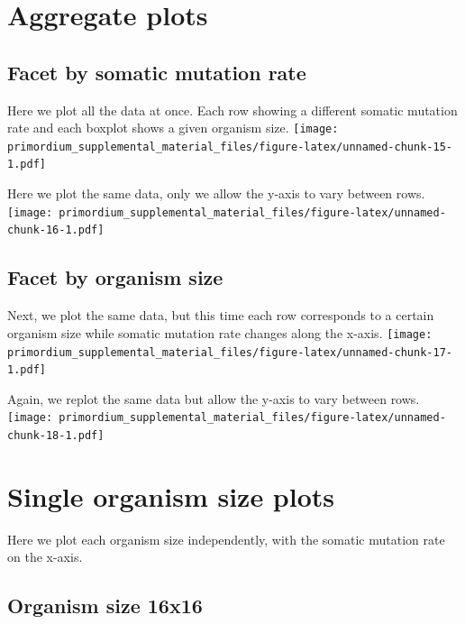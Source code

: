 \documentclass[]{book}
\begin{document}
\hypertarget{aggregate-plots-1}{%
\section{Aggregate plots}\label{aggregate-plots-1}}

\hypertarget{facet-by-somatic-mutation-rate}{%
\subsection{Facet by somatic mutation rate}\label{facet-by-somatic-mutation-rate}}

Here we plot all the data at once.
Each row showing a different somatic mutation rate and each boxplot shows a given organism size.
\texttt{[image: primordium\_supplemental\_material\_files/figure-latex/unnamed-chunk-15-1.pdf]}

Here we plot the same data, only we allow the y-axis to vary between rows.
\texttt{[image: primordium\_supplemental\_material\_files/figure-latex/unnamed-chunk-16-1.pdf]}

\hypertarget{facet-by-organism-size}{%
\subsection{Facet by organism size}\label{facet-by-organism-size}}

Next, we plot the same data, but this time each row corresponds to a certain organism size while somatic mutation rate changes along the x-axis.
\texttt{[image: primordium\_supplemental\_material\_files/figure-latex/unnamed-chunk-17-1.pdf]}

Again, we replot the same data but allow the y-axis to vary between rows.
\texttt{[image: primordium\_supplemental\_material\_files/figure-latex/unnamed-chunk-18-1.pdf]}

\hypertarget{single-organism-size-plots}{%
\section{Single organism size plots}\label{single-organism-size-plots}}

Here we plot each organism size independently, with the somatic mutation rate on the x-axis.

\hypertarget{organism-size-16x16}{%
\subsection{Organism size 16x16}\label{organism-size-16x16}}
\end{document}
